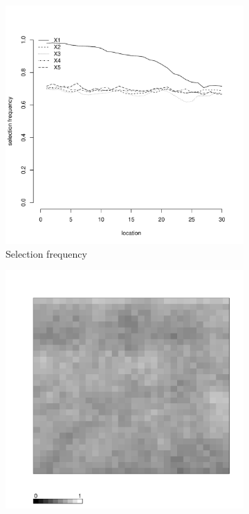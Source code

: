 \documentclass[authoryear, review, 11pt]{elsarticle}
\begin{document}
\begin{figure}
\begin{subfigure}[b]{0.45\textwidth}
		\includegraphics[width=\textwidth]{../../figures/simulation/15.18.profile_selection.pdf}
		\caption{Selection frequency}
	\end{subfigure}
	\begin{subfigure}[b]{0.45\textwidth}
	\centering
		\includegraphics[width=\textwidth]{../../figures/simulation/X1.15.18.unshrunk_bootstrap_coverage.pdf}

\end{subfigure}
\end{figure}
\end{document}

